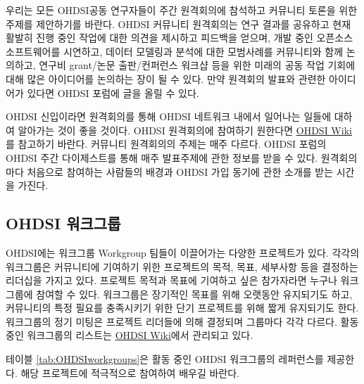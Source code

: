 \documentclass[10.5pt]{book}
\theoremstyle{definition}
\theoremstyle{definition}
\theoremstyle{definition}
\theoremstyle{remark}
\begin{document}
우리는 모든 OHDSI공동 연구자들이 주간 원격회의에 참석하고 커뮤니티
토론을 위한 주제를 제안하기를 바란다. OHDSI 커뮤니티 원격회의는 연구
결과를 공유하고 현재 활발히 진행 중인 작업에 대한 의견을 제시하고
피드백을 얻으며, 개발 중인 오픈소스 소프트웨어를 시연하고, 데이터
모델링과 분석에 대한 모범사례를 커뮤니티와 함께 논의하고, 연구비
grant/논문 출판/컨퍼런스 워크샵 등을 위한 미래의 공동 작업 기회에 대해
많은 아이디어를 논의하는 장이 될 수 있다. 만약 원격회의 발표와 관련한
아이디어가 있다면 OHDSI 포럼에 글을 올릴 수 있다.

OHDSI 신입이라면 원격회의를 통해 OHDSI 네트워크 내에서 일어나는 일들에
대하여 알아가는 것이 좋을 것이다. OHDSI 원격회의에 참여하기 원한다면
\href{https://www.ohdsi.org/web/wiki/doku.php?id=projects:ohdsi_community}{OHDSI
Wiki}를 참고하기 바란다. 커뮤니티 원격회의의 주제는 매주 다르다. OHDSI
포럼의 OHDSI 주간 다이제스트를 통해 매주 발표주제에 관한 정보를 받을 수
있다. 원격회의마다 처음으로 참여하는 사람들의 배경과 OHDSI 가입 동기에
관한 소개를 받는 시간을 가진다. 

\hypertarget{ohdsi-}{\subsection{OHDSI 워크그룹}\label{ohdsi-}}

OHDSI에는 워크그룹 Workgroup 팀들이 이끌어가는 다양한 프로젝트가 있다.
각각의 워크그룹은 커뮤니티에 기여하기 위한 프로젝트의 목적, 목표,
세부사항 등을 결정하는 리더십을 가지고 있다. 프로젝트 목적과 목표에
기여하고 싶은 참가자라면 누구나 워크그룹에 참여할 수 있다. 워크그룹은
장기적인 목표를 위해 오랫동안 유지되기도 하고, 커뮤니티의 특정 필요를
충족시키기 위한 단기 프로젝트를 위해 짧게 유지되기도 한다. 워크그룹의
정기 미팅은 프로젝트 리더들에 의해 결정되며 그룹마다 각각 다르다. 활동
중인 워크그룹의 리스트는
\href{https://www.ohdsi.org/web/wiki/doku.php?id=projects:overview}{OHDSI
Wiki}에서 관리되고 있다. 

테이블 \ref{tab:OHDSIworkgroups}은 활동 중인 OHDSI 워크그룹의 레퍼런스를
제공한다. 해당 프로젝트에 적극적으로 참여하여 배우길 바란다.
\end{document}
